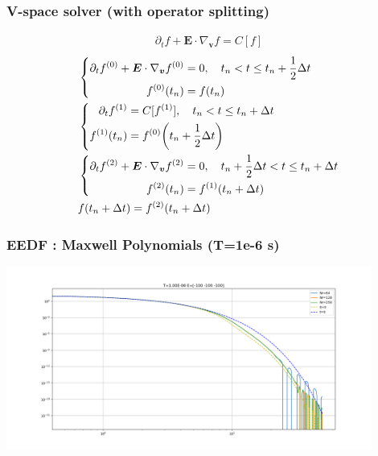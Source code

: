 \documentclass[mathserif, aspectratio=169]{beamer}
\newcommand{\vect}[1]{\boldsymbol{#1}}
\newcommand{\of}[1]{\mleft( #1 \mright)}
\begin{document}
\begin{frame}
\frametitle{V-space solver (with operator splitting)}

\begin{center}
	\small
	\begin{align*}
	\partial_t f + \vect{E}\cdot \nabla_{\vect{v}} f = C[f]
	\end{align*}
	\begin{align*}
	&\left\{
	\begin{aligned}
	\partial_t f^{(0)} + \vect{E}\cdot \nabla_{\vect{v}} f^{(0)} &= 0, \quad t_n < t \leq t_n + \frac12 \Delta t \\
	f^{(0)}\of{t_n} &= f\of{t_n}
	\end{aligned}
	\right.
	\\
	&\left\{
	\begin{aligned}
	\partial_t f^{(1)} &= C[f^{(1)}], \quad t_n < t \leq t_n + \Delta t \\
	f^{(1)}\of{t_n} &= f^{(0)}\of{t_n + \frac12 \Delta t}
	\end{aligned}
	\right.
	\\
	&\left\{
	\begin{aligned}
	\partial_t f^{(2)} + \vect{E}\cdot \nabla_{\vect{v}} f^{(2)} &= 0, \quad t_n + \frac12 \Delta t < t \leq t_n + \Delta t  \\
	f^{(2)}\of{t_n} &= f^{(1)}\of{t_n + \Delta t}
	\end{aligned}
	\right.
	\\
	& f\of{t_n + \Delta t} = f^{(2)}\of{t_n + \Delta t}
	\end{align*}
\end{center}
\end{frame}

\begin{frame}
	\frametitle{EEDF : Maxwell Polynomials (T=1e-6 s)}
	\begin{center}
		\includegraphics[width=0.9\textwidth]{figures/g0_1_maxwell_eedf.png}
	\end{center}
\end{frame}
\end{document}
